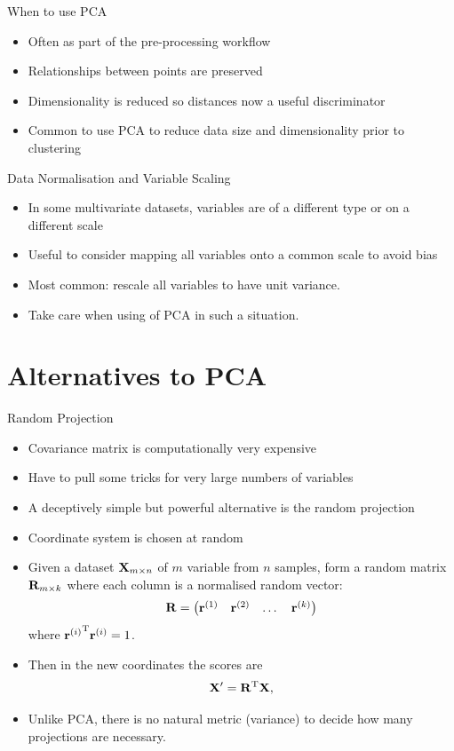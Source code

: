 \documentclass{beamer}
\begin{document}
\begin{frame}{When to use PCA}
  \begin{itemize}
    \item Often as part of the pre-processing workflow 
    \item Relationships between points are preserved 
    \item Dimensionality is reduced so distances now a useful discriminator
    \item Common to use PCA to reduce data size and dimensionality prior to clustering
  \end{itemize}
\end{frame}

\begin{frame}{Data Normalisation and Variable Scaling}
  \begin{itemize}
    \item In some multivariate datasets, variables are of a different type or on a different scale
    \item Useful to consider mapping all variables onto a common scale to avoid bias
    \item Most common: rescale all variables to have unit variance.
    \item Take care when using of PCA in such a situation.
  \end{itemize}
\end{frame}

\section{Alternatives to PCA}

\begin{frame}{Random Projection}
  \begin{itemize}
    \item Covariance matrix is computationally very expensive
    \item Have to pull some tricks for very large numbers of variables
    \item A deceptively simple but powerful alternative is the random projection
    \item Coordinate system is chosen at random
    \item Given a dataset $\mathbf{X}_{m\times n}$ of $m$ variable from $n$ samples, form a random matrix $\mathbf{R}_{m\times k}$ where each column is a normalised random vector:
      \begin{equation}
        \mathbf{R}=\begin{pmatrix}\mathbf{r}^{(1)} & \mathbf{r}^{(2)} & \dots & \mathbf{r}^{(k)}\end{pmatrix}
      \end{equation}
      where ${\mathbf{r}^{(i)}}^{\mathrm{T}}\mathbf{r}^{(i)} = 1$.
    \item Then in the new coordinates the scores are
      \begin{equation}
        \mathbf{X}' = \mathbf{R}^{\mathrm{T}}\mathbf{X},
      \end{equation}
    \item Unlike PCA, there is no natural metric (variance) to decide how many projections are necessary.
  \end{itemize}
\end{frame}
\end{document}
